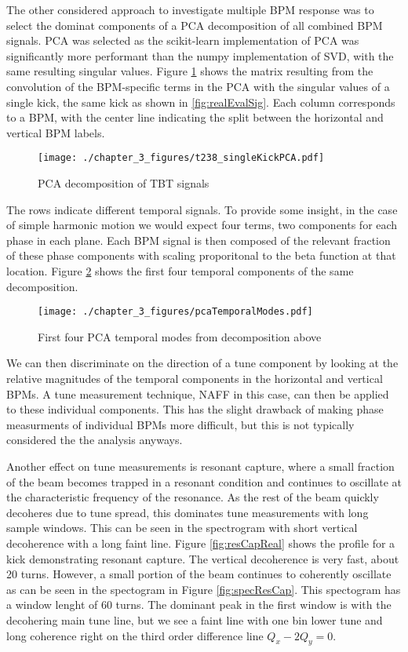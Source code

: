 The other considered approach to investigate multiple BPM response was to select the dominat components of a PCA decomposition of all combined BPM signals. PCA was selected as the scikit-learn implementation of PCA was significantly more performant than the numpy implementation of SVD, with the same resulting singular values. Figure \ref{fig:pcaComps} shows the matrix resulting from the convolution of the BPM-specific terms in the PCA with the singular values of a single kick, the same kick as shown in \ref{fig:realEvalSig}. Each column corresponds to a BPM, with the center line indicating the split between the horizontal and vertical BPM labels. 

\begin{figure}
	\centering
	\texttt{[image: ./chapter\_3\_figures/t238\_singleKickPCA.pdf]}
	\caption{PCA decomposition of TBT signals }
	\label{fig:pcaComps}
\end{figure}

The rows indicate different temporal signals. To provide some insight, in the case of simple harmonic motion we would expect four terms, two components for each phase in each plane. Each BPM signal is then composed of the relevant fraction of these phase components with scaling proporitonal to the beta function at that location. Figure \ref{fig:pcaTemps} shows the first four temporal components of the same decomposition. 

\begin{figure}
	\centering
	\texttt{[image: ./chapter\_3\_figures/pcaTemporalModes.pdf]}
	\caption{First four PCA temporal modes from decomposition above}
	\label{fig:pcaTemps}
\end{figure}

We can then discriminate on the direction of a tune component by looking at the relative magnitudes of the temporal components in the horizontal and vertical BPMs. A tune measurement technique, NAFF in this case, can then be applied to these individual components. This has the slight drawback of making phase measurments of individual BPMs more difficult, but this is not typically considered the the analysis anyways. 

Another effect on tune measurements is resonant capture, where a small fraction of the beam becomes trapped in a resonant condition and continues to oscillate at the characteristic frequency of the resonance. As the rest of the beam quickly decoheres due to tune spread, this dominates tune measurements with long sample windows. This can be seen in the spectrogram with short vertical decoherence with a long faint line. Figure \ref{fig:resCapReal} shows the profile for a kick demonstrating resonant capture. The vertical decoherence is very fast, about 20 turns. However, a small portion of the beam continues to coherently oscillate as can be seen in the spectogram in Figure \ref{fig:specResCap}. This spectogram has a window lenght of 60 turns. The dominant peak in the first window is with the decohering main tune line, but we see a faint line with one bin lower tune and long coherence right on the third order difference line $Q_x-2Q_y = 0$.

